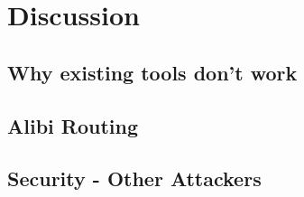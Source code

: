 \section{Discussion}
\label{discussion}

\subsection{Why existing tools don't work}

\subsection{Alibi Routing}

\subsection{Security - Other Attackers}
